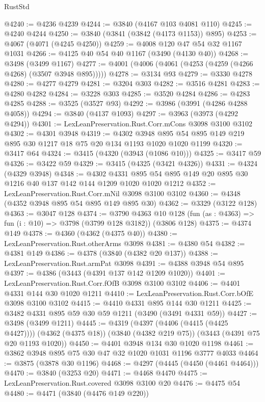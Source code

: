 \begin{lexlean}{RustStd}
\begin{coremodule}
{\begin{coremodule}
{{{{{{{{{{{{{{{{{{{{{{{{{{@4240 := @4236 @4239
@4244 := @3840 (@4167 @103 @4081 @110)
@4245 := @4240 @4244
@4250 := @3840 (@3841 (@3842 (@4173 @1153)) @895)
@4253 := @4067 (@4071 (@4245 @4250))
@4259 := @4008 @120 @47 @54 @32 @1167 @1031
@4266 := @4125 @40 @54 @40 @1167 (@3490 (@4130 @40))
@4268 := @3498 (@3499 @1167)
@4277 := @4001 (@4006 (@4061 (@4253 (@4259 (@4266 @4268) (@3507 @3948 @895)))))
@4278 := @3134 @93
@4279 := @3330 @4278
@4280 := @4277 @4279
@4281 := @3204 @303
@4282 := @3516 @4281
@4283 := @4280 @4282
@4284 := @3228 @303
@4285 := @3520 @4284
@4286 := @4283 @4285
@4288 := @3525 (@3527 @93)
@4292 := @3986 (@3991 (@4286 @4288 @4058))
@4294 := @3840 (@4137 @1093)
@4297 := @3963 (@3973 (@4292 @4294))
@4301 := LexLeanPreservation.Rust.Corr.mCons @3098 @3100 @3102
@4302 := @4301 @3948
@4319 := @4302 @3948 @895 @54 @895 @149 @219 @895 @30 @1217 @18 @75 @20 @134 @1193 @1020 @1020 @1199
@4320 := @3417 @64
@4324 := @3415 (@4320 (@3943 (@1086 @10)))
@4325 := @3417 @59
@4326 := @3422 @59
@4329 := @3415 (@4325 (@3421 @4326))
@4331 := @4324 (@4329 @3948)
@4348 := @4302
    @4331
    @895
    @54
    @895
    @149
    @20
    @895
    @30
    @1216
    @40
    @137
    @142
    @144
    @1209
    @1020
    @1020
    @1212
@4352 := LexLeanPreservation.Rust.Corr.mNil @3098 @3100 @3102
@4360 := @4348 (@4352 @3948 @895 @54 @895 @149 @895 @30)
@4362 := @3329 (@3122 @128)
@4363 := @3047 @128
@4374 := @3790
    @4363
    @10
    @128
    (fun (as : @4363) => fun (i : @10) => @3798 (@3799 @128 @3182))
    (@3806 @128)
@4375 := @4374 @149
@4378 := @4360 (@4362 (@4375 @40))
@4380 := LexLeanPreservation.Rust.otherArms @3098
@4381 := @4380 @54
@4382 := @4381 @149
@4386 := @4378 (@3840 (@4382 @20 @137))
@4388 := LexLeanPreservation.Rust.armPat @3098
@4391 := @4388 @3948 @54 @895
@4397 := @4386 (@3443 (@4391 @137 @142 @1209 @1020))
@4401 := LexLeanPreservation.Rust.Corr.fOfB @3098 @3100 @3102
@4406 := @4401 @4331 @144 @30 @1020 @1211
@4410 := LexLeanPreservation.Rust.Corr.bOfE @3098 @3100 @3102
@4415 := @4410 @4331 @895 @144 @30 @1211
@4425 := @3482 @4331 @895 @59 @30 @59 @1211 (@3490 (@3491 @4331 @59))
@4427 := @3498 (@3499 @1211)
@4445 := @4319
    (@4397 (@4406 (@4415 (@4425 @4427))))
    (@4362 (@4375 @18))
    (@3840 (@4382 @219 @75))
    (@3443 (@4391 @75 @20 @1193 @1020))
@4450 := @4401 @3948 @134 @30 @1020 @1198
@4461 := @3862 @3948 @895 @75 @30 @47 @32 @1020 @1031 @1196 @3777 @4033
@4464 := @3875 (@3878 @30 @1196)
@4468 := @4297 (@4445 (@4450 (@4461 @4464)))
@4470 := @3840 (@3253 @20)
@4471 := @4468 @4470
@4475 := LexLeanPreservation.Rust.covered @3098 @3100 @20
@4476 := @4475 @54
@4480 := @4471 (@3840 (@4476 @149 @220))
}}}}}}}}}}}}}}}}}}}}}}}}}}
\end{coremodule}}
\end{coremodule}
\end{lexlean}
